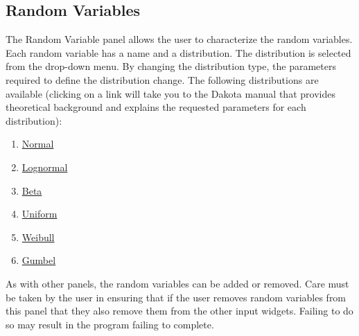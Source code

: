 \subsection{Random Variables}
The Random Variable panel allows the user to characterize the random
variables. Each random variable has a name and a distribution. The
distribution is selected from the drop-down menu. By changing the
distribution type, the parameters required to define the distribution
change. The following distributions are available (clicking on a link will take you to the Dakota manual that provides theoretical background and explains the requested parameters for each distribution):
\begin{enumerate}
\item \href{https://dakota.sandia.gov//sites/default/files/docs/6.9/html-ref/variables-normal_uncertain.html}{Normal}
\item \href{https://dakota.sandia.gov//sites/default/files/docs/6.9/html-ref/variables-lognormal_uncertain.html}{Lognormal}
\item \href{https://dakota.sandia.gov//sites/default/files/docs/6.9/html-ref/variables-beta_uncertain.html}{Beta}
\item \href{https://dakota.sandia.gov//sites/default/files/docs/6.9/html-ref/variables-uniform_uncertain.html}{Uniform}
\item \href{https://dakota.sandia.gov//sites/default/files/docs/6.9/html-ref/variables-weibull_uncertain.html}{Weibull}
\item \href{https://dakota.sandia.gov//sites/default/files/docs/6.9/html-ref/variables-gumbel_uncertain.html}{Gumbel}
\end{enumerate} 

As with other panels, the random variables can be added or
removed. Care must be taken by the user in ensuring that if the user
removes random variables from this panel that they also remove them
from the other input widgets. Failing to do so may result in the
program failing to complete.

